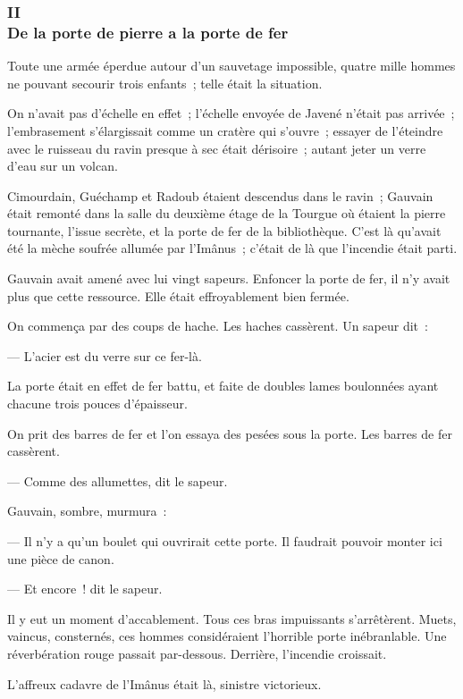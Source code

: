\documentclass[french,twoside]{book} %
\begin{document}
 \subsubsection[{II. De la porte de pierre a la porte de fer}]{II \\
De la porte de pierre a la porte de fer}
\label{p3l5c2}
\noindent Toute une armée éperdue autour d’un sauvetage impossible, quatre mille hommes ne pouvant secourir trois enfants ; telle était la situation.\par
On n’avait pas d’échelle en effet ; l’échelle envoyée de Javené n’était pas arrivée ; l’embrasement s’élargissait comme un cratère qui s’ouvre ; essayer de l’éteindre avec le ruisseau du ravin presque à sec était dérisoire ; autant jeter un verre d’eau sur un volcan.\par
Cimourdain, Guéchamp et Radoub étaient descendus dans le ravin ; Gauvain était remonté dans la salle du deuxième étage de la Tourgue où étaient la pierre tournante, l’issue secrète, et la porte de fer de la bibliothèque. C’est là qu’avait été la mèche soufrée allumée par l’Imânus ; c’était de là que l’incendie était parti.\par
Gauvain avait amené avec lui vingt sapeurs. Enfoncer la porte de fer, il n’y avait plus que cette ressource. Elle était effroyablement bien fermée.\par
On commença par des coups de hache. Les haches cassèrent. Un sapeur dit :\par
 — L’acier est du verre sur ce fer-là.\par
La porte était en effet de fer battu, et faite de doubles lames boulonnées ayant chacune trois pouces d’épaisseur.\par
On prit des barres de fer et l’on essaya des pesées sous la porte. Les barres de fer cassèrent.\par
— Comme des allumettes, dit le sapeur.\par
Gauvain, sombre, murmura :\par
— Il n’y a qu’un boulet qui ouvrirait cette porte. Il faudrait pouvoir monter ici une pièce de canon.\par
— Et encore ! dit le sapeur.\par
Il y eut un moment d’accablement. Tous ces bras impuissants s’arrêtèrent. Muets, vaincus, consternés, ces hommes considéraient l’horrible porte inébranlable. Une réverbération rouge passait par-dessous. Derrière, l’incendie croissait.\par
L’affreux cadavre de l’Imânus était là, sinistre victorieux.\par
\end{document}
